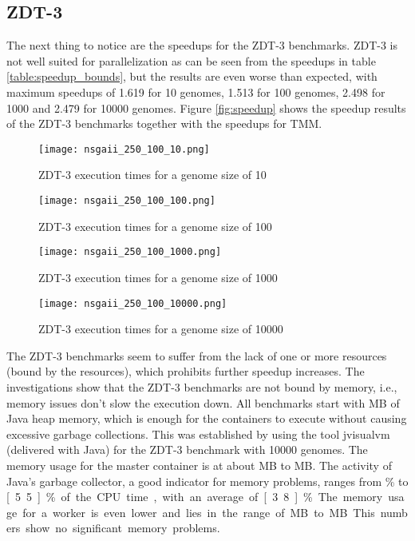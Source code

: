 \subsection{ZDT-3}
\label{chap:evaluation:result:zdt3}
The next thing to notice are the speedups for the ZDT-3 benchmarks. ZDT-3 is not well suited for parallelization as can be seen from the speedups in table \ref{table:speedup_bounds}, but the results are even worse than expected, with maximum speedups of 1.619 for 10 genomes, 1.513 for 100 genomes, 2.498 for 1000 and 2.479 for 10000 genomes. Figure \ref{fig:speedup} shows the speedup results of the ZDT-3 benchmarks together with the speedups for TMM.

\begin{figure}
  \centering
  \texttt{[image: nsgaii\_250\_100\_10.png]}
  \caption[ZDT-3 execution times for a genome size of 10]{ZDT-3 execution times for a genome size of 10}
  \label{fig:nsga_250_100_10}
\end{figure}
\begin{figure}
  \centering
  \texttt{[image: nsgaii\_250\_100\_100.png]}
  \caption[ZDT-3 execution times for a genome size of 100]{ZDT-3 execution times for a genome size of 100}
  \label{fig:nsga_250_100_100}
\end{figure}
\begin{figure}
  \centering
  \texttt{[image: nsgaii\_250\_100\_1000.png]}
  \caption[ZDT-3 execution times for a genome size of 1000]{ZDT-3 execution times for a genome size of 1000}
  \label{fig:nsga_250_100_1000}
\end{figure}
\begin{figure}
  \centering
  \texttt{[image: nsgaii\_250\_100\_10000.png]}
  \caption[ZDT-3 execution times for a genome size of 10000]{ZDT-3 execution times for a genome size of 10000}
  \label{fig:nsga_250_100_10000}
\end{figure}

The ZDT-3 benchmarks seem to suffer from the lack of one or more resources (bound by the resources), which prohibits further speedup increases. The investigations show that the ZDT-3 benchmarks are not bound by memory, i.e., memory issues don't slow the execution down. All benchmarks start with \unit[256]{MB} of Java heap memory, which is enough for the containers to execute without causing excessive garbage collections. This was established by using the tool jvisualvm (delivered with Java) for the ZDT-3 benchmark with 10000 genomes. The memory usage for the master container is at about \unit[100]{MB} to \unit[150]{MB}. The activity of Java's garbage collector, a good indicator for memory problems, ranges from \unit[3]{\%} to \unit[5.5]{\%} of the CPU time, with an average of \unit[3.8]{\%}. The memory usage for a worker is even lower and lies in the range of \unit[5]{MB} to \unit[30]{MB}. This numbers show no significant memory problems.

